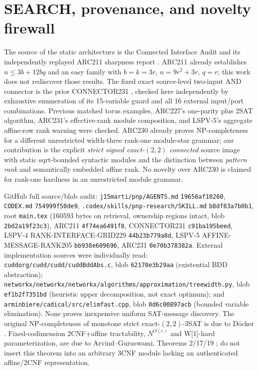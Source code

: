 \documentclass[10pt]{article}
\begin{document}
\section{SEARCH, provenance, and novelty firewall}
The source of the static architecture is the Connected Interface Audit and its independently replayed ARC211 sharpness report \cite{arc211}. ARC211 already establishes $n\le3b+12bq$ and an easy family with $b=k=3r$, $n=9r^2+3r$, $q=r$; this work does not rediscover those results. The fixed exact source-level two-input AND connector is the prior CONNECTOR231 \cite{connector231}, checked here independently by exhaustive enumeration of its 15-variable guard and all 16 external input/port combinations. Previous matched torus examples, ARC227's one-parity plus 2SAT algorithm, ARC231's effective-rank module composition, and LSPV-5's aggregate affine-row rank warning were checked. ARC230 already proves NP-completeness for a different unrestricted width-three rank-one module-star grammar; our contribution is the explicit \emph{strict signed exact-$(2,2)$ connected} source image with static sqrt-bounded syntactic modules and the distinction between \emph{pattern rank} and semantically embedded affine rank. No novelty over ARC230 is claimed for rank-one hardness in an unrestricted module grammar.

\noindent GitHub full source/blob audit: \texttt{j15marti/pnp/AGENTS.md} \texttt{19656af10260}, \texttt{CODEX.md} \texttt{754999f50de9}, \texttt{.codex/skills/pnp-research/SKILL.md} \texttt{b8df83a7b0b1}, root \texttt{main.tex} (160593 bytes on retrieval, ownership regions intact, blob \texttt{2bd2a19f23c3}), ARC211 \texttt{4f74ea6491f8}, CONNECTOR231 \texttt{c91ba195beed}, LSPV-4 RANK-INTERFACE-GRID229 \texttt{44b23b779a8d}, LSPV-5 AFFINE-MESSAGE-RANK205 \texttt{bb938e609696}, ARC231 \texttt{0e70b378382a}. External implementation sources were individually read: \texttt{cuddorg/cudd/cudd/cuddBddAbs.c}, blob \texttt{62170e3b29aa} (existential BDD abstraction); \texttt{networkx/networkx/networkx/algorithms/approximation/treewidth.py}, blob \texttt{ef1b2f7351bd} (heuristic upper decomposition, not exact optimum); and \texttt{arminbiere/cadical/src/elimfast.cpp}, blob \texttt{0d6c00897acb} (bounded variable elimination). None proves inexpensive uniform SAT-message discovery. The original NP-completeness of monotone strict exact-$(2,2)$-3SAT is due to D\"ocker \cite{docker}. Fixed-codimension 2CNF+affine tractability, $N^{O(e)}$ and W[1]-hard parameterization, are due to Arvind--Guruswami, Theorems 2/17/19 \cite{ag}; do not insert this theorem into an arbitrary 3CNF module lacking an authenticated affine/2CNF representation.
\end{document}
